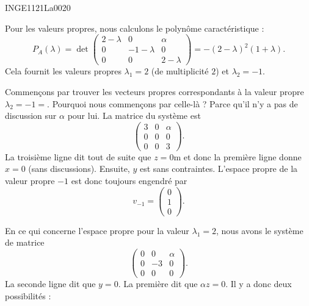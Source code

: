 

\begin{corrige}{INGE1121La0020}

	Pour les valeurs propres, nous calculons le polynôme caractéristique :
	\begin{equation}
		P_A(\lambda)=\det\begin{pmatrix}
			2-\lambda	&	0	&	\alpha	\\
			0	&	-1-\lambda	&	0	\\
			0	&	0	&	2-\lambda
		\end{pmatrix}
		=
		-(2-\lambda)^2(1+\lambda).
	\end{equation}
	Cela fournit les valeurs propres $\lambda_1=2$ (de multiplicité $2$) et $\lambda_2=-1$.

	Commençons par trouver les vecteurs propres correspondants à la valeur propre $\lambda_2=-1=$. Pourquoi nous commençons par celle-là ? Parce qu'il n'y a pas de discussion sur $\alpha$ pour lui. La matrice du système est
	\begin{equation}
		\begin{pmatrix}
			3	&	0	&	\alpha	\\
			0	&	0	&	0	\\
			0	&	0	&	3
		\end{pmatrix}.
	\end{equation}
	La troisième ligne dit tout de suite que $z=0$m et donc la première ligne donne $x=0$ (sans discussions). Ensuite, $y$ est sans contraintes. L'espace propre de la valeur propre $-1$ est donc toujours engendré par
	\begin{equation}
		v_{-1}=\begin{pmatrix}
			0	\\ 
			1	\\ 
			0	
		\end{pmatrix}.
	\end{equation}

	En ce qui concerne l'espace propre pour la valeur $\lambda_1=2$, nous avons le système de matrice
	\begin{equation}
		\begin{pmatrix}
			0	&	0	&	\alpha	\\
			0	&	-3	&	0	\\
			0	&	0	&	0
		\end{pmatrix}.
	\end{equation}
	La seconde ligne dit que $y=0$. La première dit que $\alpha z=0$. Il y a donc deux possibilités :
	\begin{enumerate}


\end{enumerate}
\end{corrige}
